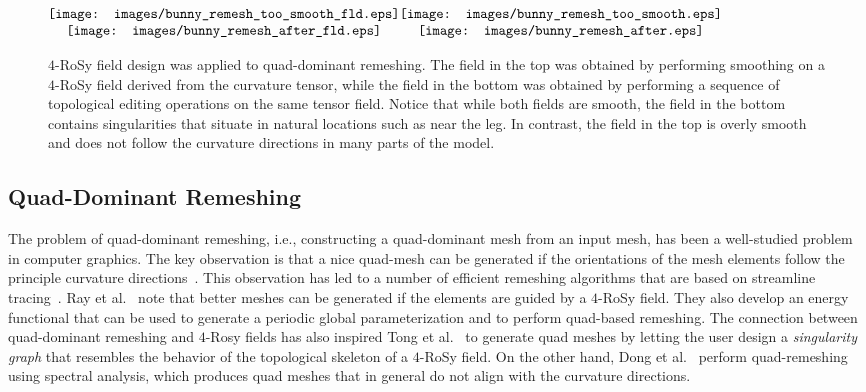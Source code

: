 \documentclass{acmsiggraph}               %
\begin{document}
\begin{figure}[t]
\begin{center}
    $\begin{array}{@{\hspace{-0.02in}}c@{\hspace{0.0in}}c}
    \texttt{[image: images/bunny\_remesh\_too\_smooth\_fld.eps]}
    &\texttt{[image: images/bunny\_remesh\_too\_smooth.eps]}\\
    \texttt{[image: images/bunny\_remesh\_after\_fld.eps]}
    &\texttt{[image: images/bunny\_remesh\_after.eps]}\\
\end{array}$
\end{center}
\caption{ $4$-RoSy field design was applied to quad-dominant
remeshing. The field in the top was obtained by performing smoothing
on a $4$-RoSy field derived from the curvature tensor, while the
field in the bottom was obtained by performing a sequence of
topological editing operations on the same tensor field. Notice that
while both fields are smooth, the field in the bottom contains
singularities that situate in natural locations such as near the
leg. In contrast, the field in the top is overly smooth and does not
follow the curvature directions in many parts of the model. }
\label{fig:quad_remesh}
\end{figure}

\subsection{Quad-Dominant Remeshing}
\label{sec:remeshing}

The problem of quad-dominant remeshing, i.e., constructing a
quad-dominant mesh from an input mesh, has been a well-studied
problem in computer graphics. The key observation is that a nice
quad-mesh can be generated if the orientations of the mesh elements
follow the principle curvature directions~\cite{Alliez:03}. This
observation has led to a number of efficient remeshing algorithms
that are based on streamline
tracing~\cite{Alliez:03,Marinov:04,Dong:05}. Ray et
al.~ note that better meshes can be generated if
the elements are guided by a $4$-RoSy field. They also develop an
energy functional that can be used to generate a periodic global
parameterization and to perform quad-based remeshing. The connection
between quad-dominant remeshing and $4$-Rosy fields has also
inspired Tong et al.~ to generate quad meshes by
letting the user design a {\em singularity graph} that resembles the
behavior of the topological skeleton of a $4$-RoSy field. On the
other hand, Dong et al.~ perform quad-remeshing
using spectral analysis, which produces quad meshes that in general
do not align with the curvature directions.
\end{document}
